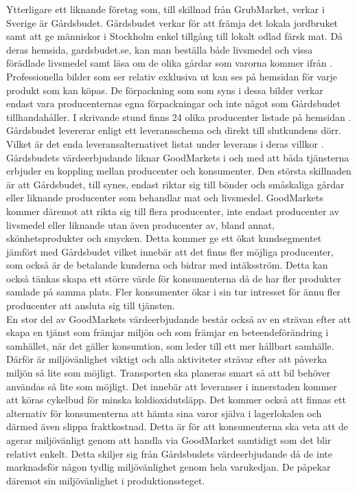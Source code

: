 \documentclass[10pt,a4paper,oneside]{article}
\begin{document}
Ytterligare ett liknande företag som, till skillnad från GrubMarket, verkar i Sverige är Gårdsbudet. Gårdsbudet verkar för att främja det lokala jordbruket samt att ge människor i Stockholm enkel tillgång till lokalt odlad färsk mat. Då deras hemsida, gardsbudet.se, kan man beställa både livsmedel och vissa förädlade livsmedel samt läsa om de olika gårdar som varorna kommer ifrån \cite{GB3}. Professionella bilder som ser relativ exklusiva ut kan ses på hemsidan för varje produkt som kan köpas. De förpackning som som syns i dessa bilder verkar endast vara producenternas egna förpackningar och inte något som Gårdsbudet tillhandahåller. I skrivande stund finns 24 olika producenter listade på hemsidan \cite{GB2}. Gårdsbudet levererar enligt ett leveransschema och direkt till slutkundens dörr. Vilket är det enda leveransalternativet listat under leverans i deras villkor \cite{GB1}. Gårdsbudets värdeerbjudande liknar GoodMarkets i och med att båda tjänsterna erbjuder en koppling mellan producenter och konsumenter. Den största skillnaden är att Gårdsbudet, till synes, endast riktar sig till bönder och småskaliga gårdar eller liknande producenter som behandlar mat och livsmedel. GoodMarkets kommer däremot att rikta sig till flera producenter, inte endast producenter av livsmedel eller liknande utan även producenter av, bland annat,  skönhetsprodukter och smycken. Detta kommer ge ett ökat kundsegmentet jämfört med Gårdsbudet vilket innebär att det finns fler möjliga producenter, som också är de betalande kunderna och bidrar med intäksström. Detta kan också tänkas skapa ett större värde för konsumenterna då de har fler produkter samlade på samma plats. Fler konsumenter ökar i sin tur intresset för ännu fler producenter att ansluta sig till tjänsten. \\

En stor del av GoodMarkets värdeerbjudande består också av en strävan efter att skapa en tjänst som främjar miljön och som främjar en beteendeförändring i samhället, när det gäller konsumtion,  som leder till ett mer hållbart samhälle. Därför är miljövänlighet viktigt och alla aktiviteter strävar efter att påverka miljön så lite som möjligt. Transporten ska planeras smart så att bil behöver användas så lite som möjligt. Det innebär att leveranser i innerstaden kommer att köras cykelbud för minska koldioxidutsläpp. Det kommer också att finnas ett alternativ för konsumenterna att hämta sina varor själva i lagerlokalen och därmed även slippa fraktkostnad. Detta är för att konsumenterna ska veta att de agerar miljövänligt genom att handla via GoodMarket samtidigt som det blir relativt enkelt. Detta skiljer sig från Gårdsbudets värdeerbjudande då de inte marknadsför någon tydlig miljövänlighet genom hela varukedjan. De påpekar däremot sin miljövänlighet i produktionssteget. 
\end{document}
